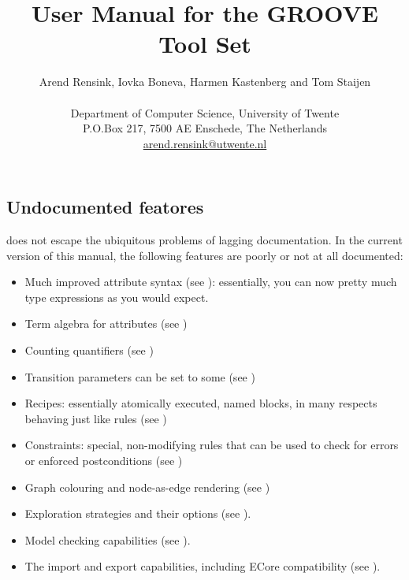 \title{User Manual for the GROOVE Tool Set}
\author{Arend Rensink, Iovka Boneva, Harmen Kastenberg and Tom Staijen \\
%
\vspace{0.2in} \\
%
Department of Computer Science, University of Twente \\
P.O.Box 217, 7500 AE Enschede, The Netherlands \\
\url{arend.rensink@utwente.nl}
}
\maketitle
%
\vspace{0.2in}

\clearpage
\tableofcontents

\clearpage
\subsection{Undocumented featores}

\GROOVE does not escape the ubiquitous problems of lagging documentation. In
the current version of this manual, the following features are poorly or not
at all documented:
%
\begin{itemize}[noitemsep]
\item Much improved attribute syntax (see ): essentially, you can now pretty much type expressions as you would expect.
\item Term algebra for attributes (see )
\item Counting quantifiers (see )
\item Transition parameters can be set to \textsf{some} (see )
\item Recipes: essentially atomically executed, named blocks, in many respects behaving just like rules (see )
\item Constraints: special, non-modifying rules that can be used to check for errors or enforced postconditions (see )
\item Graph colouring and node-as-edge rendering (see )
\item Exploration strategies and their options (see ). 
\item Model checking capabilities (see ). 
\item The import and export capabilities, including ECore compatibility (see ).
\end{itemize}

